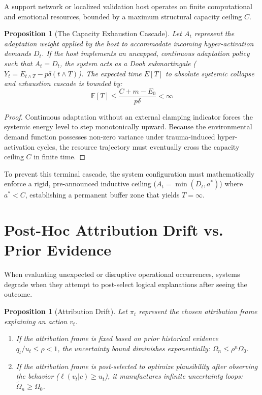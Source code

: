 \documentclass[11pt,oneside,letterpaper]{article}
\newtheorem{proposition}[theorem]{Proposition}
\newcommand{\E}{\mathbb{E}}
\begin{document}
A support network or localized validation host operates on finite computational and emotional resources, bounded by a maximum structural capacity ceiling $C$.

\begin{proposition}[The Capacity Exhaustion Cascade]
Let $A_t$ represent the adaptation weight applied by the host to accommodate incoming hyper-activation demands $D_t$. If the host implements an uncapped, continuous adaptation policy such that $A_t = D_t$, the system acts as a Doob submartingale ($Y_t = E_{t\wedge T} - p\delta(t\wedge T)$). The expected time $E[T]$ to absolute systemic collapse and exhaustion cascade is bounded by:
\begin{equation}
\E[T] \le \frac{C + m - E_0}{p\delta} < \infty
\end{equation}
\end{proposition}

\begin{proof}
Continuous adaptation without an external clamping indicator forces the systemic energy level to step monotonically upward. Because the environmental demand function possesses non-zero variance under trauma-induced hyper-activation cycles, the resource trajectory must eventually cross the capacity ceiling $C$ in finite time.
\end{proof}

To prevent this terminal cascade, the system configuration must mathematically enforce a rigid, pre-announced inductive ceiling ($A_t = \min(D_t, a^*)$) where $a^* < C$, establishing a permanent buffer zone that yields $T = \infty$.

\section{Post-Hoc Attribution Drift vs. Prior Evidence}

When evaluating unexpected or disruptive operational occurrences, systems degrade when they attempt to post-select logical explanations after seeing the outcome.

\begin{proposition}[Attribution Drift]
Let $\pi_t$ represent the chosen attribution frame explaining an action $v_t$.
\begin{enumerate}[label=\arabic*.]
    \item If the attribution frame is fixed based on prior historical evidence $q_t/u_t \le \rho < 1$, the uncertainty bound diminishes exponentially: $\Omega_n \le \rho^n \Omega_0$.
    \item If the attribution frame is post-selected to optimize plausibility after observing the behavior ($\ell(v_t|c) \ge u_t$), it manufactures infinite uncertainty loops: $\tilde{\Omega}_n \ge \Omega_0$.
\end{enumerate}
\end{proposition}
\end{document}
